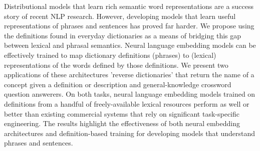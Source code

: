 Distributional models that learn rich semantic word representations are a success story of recent NLP research. However, developing models that learn useful representations of phrases and sentences has proved far harder. We propose using the definitions found in everyday dictionaries as a means of bridging this gap between lexical and phrasal semantics. Neural language embedding models can be effectively trained to map dictionary definitions (phrases) to (lexical) representations of the words defined by those definitions. We present two applications of these architectures 'reverse dictionaries' that return the name of a concept given a definition or description and general-knowledge crossword question answerers. On both tasks, neural language embedding models trained on definitions from a handful of freely-available lexical resources perform as well or better than existing commercial systems that rely on significant task-specific engineering. The results highlight the effectiveness of both neural embedding architectures and definition-based training for developing models that understand phrases and sentences.